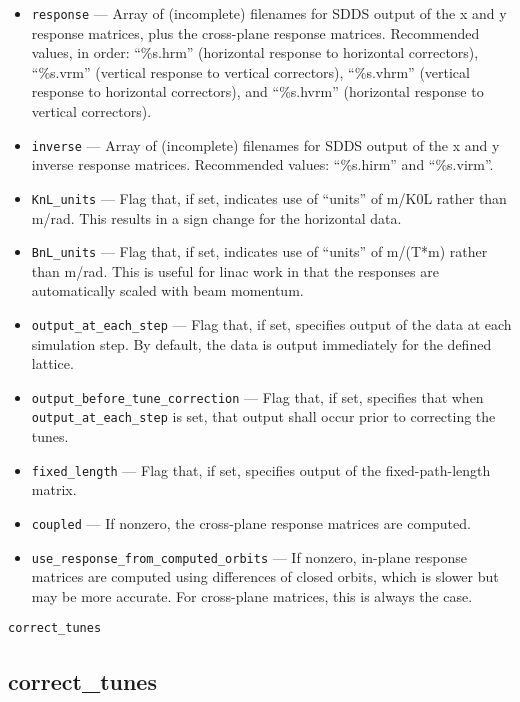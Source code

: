 \documentclass[11pt]{article}
\begin{document}
\begin{itemize}
\item \verb|response| --- Array of (incomplete) filenames for SDDS output of the x and y response
matrices, plus the cross-plane response matrices.  Recommended values, in order: ``\%s.hrm'' (horizontal
response to horizontal correctors), ``\%s.vrm'' (vertical response to vertical correctors),
``\%s.vhrm'' (vertical response to horizontal correctors), and 
``\%s.hvrm'' (horizontal response to vertical correctors).
\item \verb|inverse| --- Array of (incomplete) filenames for SDDS output of the x and y 
inverse response matrices. Recommended values: ``\%s.hirm'' and ``\%s.virm''.
\item \verb|KnL_units| --- Flag that, if set, indicates use of ``units'' of m/K0L rather than
m/rad.  This results in a sign change for the horizontal data.
\item \verb|BnL_units| --- Flag that, if set, indicates use of ``units'' of m/(T*m) rather than
m/rad.  This is useful for linac work in that the responses are automatically scaled with 
beam momentum.
\item \verb|output_at_each_step| --- Flag that, if set, specifies output of the data at
each simulation step.  By default, the data is output immediately for the defined lattice.
\item \verb|output_before_tune_correction| --- Flag that, if set, specifies that when 
\verb|output_at_each_step| is set, that output shall occur prior to correcting the tunes.
\item \verb|fixed_length| --- Flag that, if set, specifies output of the fixed-path-length
matrix.
\item \verb|coupled| --- If nonzero, the cross-plane response matrices are computed.
\item \verb|use_response_from_computed_orbits| --- If nonzero, in-plane response matrices are computed
  using differences of closed orbits, which is slower but may be more accurate. For cross-plane matrices, this is always the case.
\end{itemize}

\newpage
\begin{center}{\Large\verb|correct_tunes|}\end{center}
\subsection{correct\_tunes \label{subsec:correcttunes}}
\end{document}
